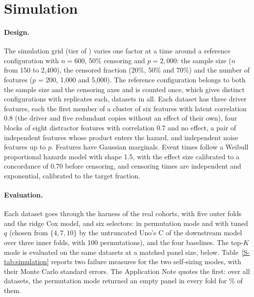 \begin{table}[htbp]
\centering\footnotesize
\caption{Gene sets with a Benjamini-Hochberg adjusted $P < 0.05$, per cohort and ranking.
Genes: protein-coding RNA features of the cohort, those lost in the mapping to symbols
(no symbol or a duplicated one) and those ranked. Sets tested: sets of 5 to 500 genes
after mapping to the cohort's genes.}
\label{S-tab:gsea}

\end{table}

\section{Simulation}\label{S-sec:simulation}

\paragraph{Design.} The simulation grid
(tier  of ) varies one factor at a
time around a reference configuration with $n = 600$, 50\% censoring and $p = 2{,}000$:
the sample size ($n$ from 150 to 2{,}400), the censored fraction (20\%, 50\% and 70\%)
and the number of features ($p$ = 200, 1{,}000 and 5{,}000). The reference configuration
belongs to both the sample size and the censoring axes and is counted once, which gives
\SuppSimConfigs{} distinct configurations with \SuppSimReps{} replicates each,
\SuppSimDatasets{} datasets in all. Each dataset has three driver features, each the first
member of a cluster of six features with latent correlation 0.8 (the driver and five
redundant copies without an effect of their own), four blocks of eight distractor features
with correlation 0.7 and no effect, a pair of independent features whose product enters
the hazard, and independent noise features up to $p$. Features have Gaussian marginals.
Event times follow a Weibull proportional hazards model with shape 1.5, with the effect
size calibrated to a concordance of 0.70 before censoring, and censoring times are
independent and exponential, calibrated to the target fraction.

\paragraph{Evaluation.} Each dataset goes through the harness of the real cohorts, with
five outer folds and the ridge Cox model, and six selectors:  in permutation
mode and with tuned $q$ (chosen from $\{4, 7, 10\}$ by the untruncated Uno's C of the
downstream model over three inner folds, with 100 permutations), and the four baselines. The top-$K$ mode is evaluated on the same datasets at a matched panel size,
below. Table~\ref{S-tab:simulation}
reports two failure measures for the two self-sizing  modes, with their
Monte Carlo standard errors. The Application Note quotes the first: over all datasets,
the permutation mode returned an empty panel in every fold for \SuppSimEmptyPerm\% of
them.

